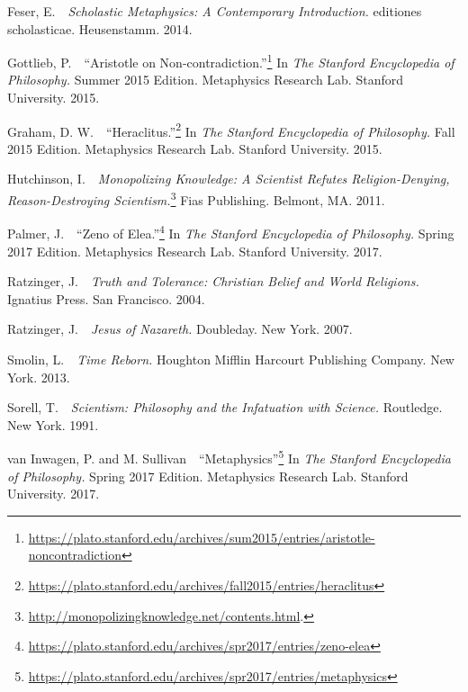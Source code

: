 \documentclass[twocolumn]{article}
\begin{document}
\begin{thebibliography}{}
\begin{small}
      Feser, E.\ \ {\it Scholastic Metaphysics: A Contemporary Introduction.}
      editiones scholasticae.  Heusenstamm.  2014.

      Gottlieb, P.\ \ ``Aristotle on Non-contradiction.''\footnote{%
         \url{https://plato.stanford.edu/archives/sum2015/entries/aristotle-noncontradiction}%
      }
      In {\it The Stanford Encyclopedia of Philosophy.}  Summer 2015 Edition.
      Metaphysics Research Lab.  Stanford University.  2015.

      Graham, D. W.\ \ ``Heraclitus.''\footnote{%
         \url{https://plato.stanford.edu/archives/fall2015/entries/heraclitus}
      }
      In {\it The Stanford Encyclopedia of Philosophy.}  Fall 2015 Edition.
      Metaphysics Research Lab.  Stanford University.  2015.

      Hutchinson, I.\ \ {\it Monopolizing Knowledge: A Scientist Refutes
      Religion-Denying, Reason-Destroying Scientism.}\footnote{%
         \url{http://monopolizingknowledge.net/contents.html}.%
      }
      Fias Publishing.  Belmont, MA.  2011.

      Palmer, J.\ \ ``Zeno of Elea.''\footnote{%
         \url{https://plato.stanford.edu/archives/spr2017/entries/zeno-elea}%
      }
      In {\it The Stanford Encyclopedia of Philosophy.}  Spring 2017 Edition.
      Metaphysics Research Lab.  Stanford University.  2017.

      Ratzinger, J.\ \ {\it Truth and Tolerance: Christian Belief and World
      Religions.}  Ignatius Press.  San Francisco.  2004.

      Ratzinger, J.\ \ {\it Jesus of Nazareth.}  Doubleday.  New York.  2007.

      Smolin, L.\ \ {\it Time Reborn.}  Houghton Mifflin Harcourt Publishing
      Company.  New York.  2013.

      Sorell, T.\ \ {\it Scientism: Philosophy and the Infatuation with
      Science.}  Routledge.  New York.  1991.

      van Inwagen, P. and M. Sullivan\ \ ``Metaphysics''\footnote{%
         \url{https://plato.stanford.edu/archives/spr2017/entries/metaphysics}%
      }
      In {\it The Stanford Encyclopedia of Philosophy.}  Spring 2017 Edition.
      Metaphysics Research Lab.  Stanford University.  2017.


\end{small}
\end{thebibliography}
\end{document}
